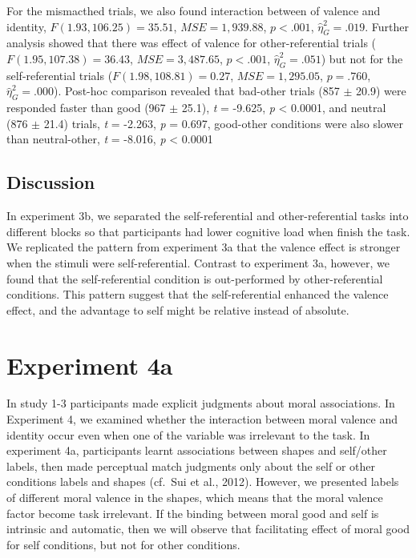 \documentclass[
  english,
  man]{apa6}
\begin{document}
For the mismacthed trials, we also found interaction between of valence and identity, \(F(1.93, 106.25) = 35.51\), \(\mathit{MSE} = 1,939.88\), \(p < .001\), \(\hat{\eta}^2_G = .019\). Further analysis showed that there was effect of valence for other-referential trials (\(F(1.95, 107.38) = 36.43\), \(\mathit{MSE} = 3,487.65\), \(p < .001\), \(\hat{\eta}^2_G = .051\)) but not for the self-referential trials (\(F(1.98, 108.81) = 0.27\), \(\mathit{MSE} = 1,295.05\), \(p = .760\), \(\hat{\eta}^2_G = .000\)). Post-hoc comparison revealed that bad-other trials (857 \(\pm\) 20.9) were responded faster than good (967 \(\pm\) 25.1), \emph{t} = -9.625, \emph{p} \textless{} 0.0001, and neutral (876 \(\pm\) 21.4) trials, \emph{t} = -2.263, \emph{p} = 0.697, good-other conditions were also slower than neutral-other, \emph{t} = -8.016, \emph{p} \textless{} 0.0001

\hypertarget{discussion-3}{%
\subsection{Discussion}\label{discussion-3}}

In experiment 3b, we separated the self-referential and other-referential tasks into different blocks so that participants had lower cognitive load when finish the task. We replicated the pattern from experiment 3a that the valence effect is stronger when the stimuli were self-referential. Contrast to experiment 3a, however, we found that the self-referential condition is out-performed by other-referential conditions. This pattern suggest that the self-referential enhanced the valence effect, and the advantage to self might be relative instead of absolute.

\hypertarget{experiment-4a}{%
\section{Experiment 4a}\label{experiment-4a}}

In study 1-3 participants made explicit judgments about moral associations. In Experiment 4, we examined whether the interaction between moral valence and identity occur even when one of the variable was irrelevant to the task. In experiment 4a, participants learnt associations between shapes and self/other labels, then made perceptual match judgments only about the self or other conditions labels and shapes (cf.~Sui et al., 2012). However, we presented labels of different moral valence in the shapes, which means that the moral valence factor become task irrelevant. If the binding between moral good and self is intrinsic and automatic, then we will observe that facilitating effect of moral good for self conditions, but not for other conditions.
\end{document}
